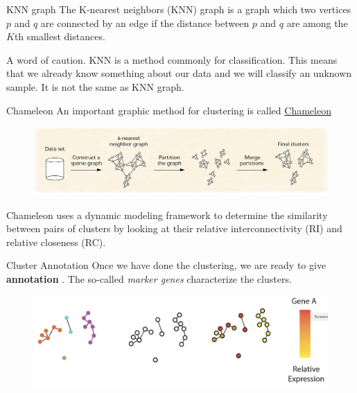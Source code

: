 \documentclass{beamer}
\begin{document}
\begin{frame}{KNN graph}
	The K-nearest neighbors (KNN) graph is a graph which two vertices $p$ and $q$ are connected by an edge if the distance between $p$ and $q$ are among the $K$th smallest distances.
	
	A word of caution. KNN is a method commonly for classification. This means that we already know something about our data and we will classify an unknown sample. It is not the same as KNN graph.
	
	
\end{frame}

\begin{frame}{Chameleon}
	An important graphic method for clustering is called \href{https://doi.org/10.1109/2.781637}{Chameleon}

				\begin{figure}[h]
	\centering
	\includegraphics[scale=0.3]{../../Figures/chameleon.png}
\end{figure}	
Chameleon uses a dynamic modeling framework to
determine the similarity between pairs of clusters by looking
at their relative interconnectivity (RI) and relative
closeness (RC).
	
\end{frame}

\begin{frame}{Cluster Annotation}
	Once we have done the clustering, we are ready to give {\bf annotation} . The so-called {\sl marker genes} characterize the clusters.
	 
				\begin{figure}[h]
	\centering
	\includegraphics[scale=0.3]{../../Figures/sc_annotation.png}
\end{figure}		
	
\end{frame}
	
\end{document}
